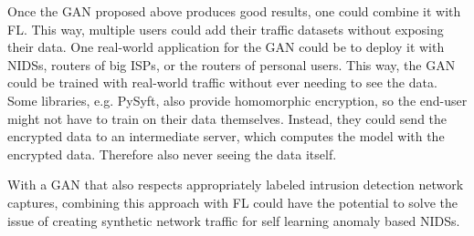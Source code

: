 \documentclass[
	ngerman,
	ruledheaders=section,%
	class=report,%
	thesis={type=bachelor},%
	accentcolor=9c,%
	custommargins=true,%
	marginpar=false,%
	parskip=half-,%
	fontsize=11pt,%
]{tudapub}
\begin{document}
Once the GAN proposed above produces good results, one could combine it with FL.
This way, multiple users could add their traffic datasets without exposing their data.
One real-world application for the GAN could be to deploy it with NIDSs, routers of big ISPs, or the routers of personal users.
This way, the GAN could be trained with real-world traffic without ever needing to see the data.
Some libraries, e.g. PySyft, also provide homomorphic encryption, so the end-user might not have to train on their data themselves.
Instead, they could send the encrypted data to an intermediate server, which computes the model with the encrypted data.
Therefore also never seeing the data itself.

With a GAN that also respects appropriately labeled intrusion detection network captures,
combining this approach with FL could have the potential to solve the issue of creating synthetic network traffic for self learning anomaly based NIDSs.

\printbibliography
\end{document}
